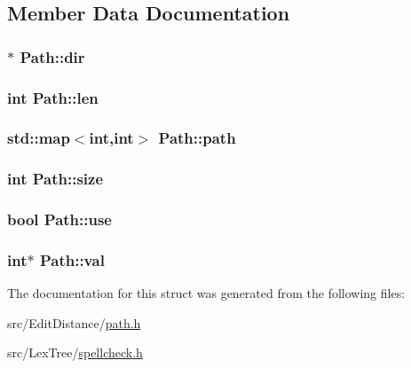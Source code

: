\subsection{Member Data Documentation}
\hypertarget{struct_path_a48a4abe4c0c17bd705d650ac2e4fea98}{
\subsubsection[{dir}]{$\ast$ Path\+::dir}}\label{struct_path_a48a4abe4c0c17bd705d650ac2e4fea98}
\hypertarget{struct_path_a3495299d7cfe9c09f4559f3bf33d58e9}{
\subsubsection[{len}]{\setlength{\rightskip}{0pt plus 5cm}int Path\+::len}}\label{struct_path_a3495299d7cfe9c09f4559f3bf33d58e9}
\hypertarget{struct_path_a3ef5985a151fd31af4b3510ed08129fc}{
\subsubsection[{path}]{\setlength{\rightskip}{0pt plus 5cm}std\+::map$<$int,int$>$ Path\+::path}}\label{struct_path_a3ef5985a151fd31af4b3510ed08129fc}
\hypertarget{struct_path_a3020a9bdb6f4181571b616468577627a}{
\subsubsection[{size}]{\setlength{\rightskip}{0pt plus 5cm}int Path\+::size}}\label{struct_path_a3020a9bdb6f4181571b616468577627a}
\hypertarget{struct_path_a44f7e932bded8d8eef1febd440c9516a}{
\subsubsection[{use}]{\setlength{\rightskip}{0pt plus 5cm}bool Path\+::use}}\label{struct_path_a44f7e932bded8d8eef1febd440c9516a}
\hypertarget{struct_path_add6f2732f31960bd9be2e6dda9f7d9ab}{
\subsubsection[{val}]{\setlength{\rightskip}{0pt plus 5cm}int$\ast$ Path\+::val}}\label{struct_path_add6f2732f31960bd9be2e6dda9f7d9ab}


The documentation for this struct was generated from the following files\+:\begin{DoxyCompactItemize}
\item 
src/\+Edit\+Distance/\hyperlink{path_8h}{path.\+h}\item 
src/\+Lex\+Tree/\hyperlink{spellcheck_8h}{spellcheck.\+h}\end{DoxyCompactItemize}
